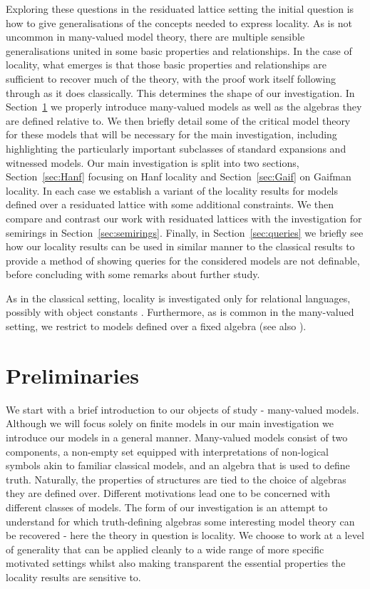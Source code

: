 \documentclass{lmcs} %
\newcommand{\?}{\ensuremath{\mkern0.4\thinmuskip}}
\begin{document}
Exploring these questions in the residuated lattice setting the initial question is how to give generalisations of the concepts needed to express locality. As is not uncommon in many-valued model theory, there are multiple sensible generalisations united in some basic properties and relationships. In the case of locality, what emerges is that those basic properties and relationships are sufficient to recover much of the theory, with the proof work itself following through as it does classically. This determines the shape of our investigation. In Section~\ref{sec:Prelim} we properly introduce many-valued models as well as the algebras they are defined relative to. We then briefly detail some of the critical model theory for these models that will be necessary for the main investigation, including highlighting the particularly important subclasses of standard expansions and witnessed models. Our main investigation is split into two sections, Section~\ref{sec:Hanf} focusing on Hanf locality and Section~\ref{sec:Gaif} on Gaifman locality. In each case we establish a variant of the locality results for models defined over a residuated lattice with some additional constraints. We then compare and contrast our work with residuated lattices with the investigation for semirings in Section~\ref{sec:semirings}. Finally, in Section~\ref{sec:queries} we briefly see how our locality results can be used in similar manner to the classical results to provide a method of showing queries for the considered models are not definable, before concluding with some remarks about further study. 

As in the classical setting, locality is investigated only for relational languages, possibly with object constants \cite{EbbinghausFlum95:Finmodeltheory,Libkin04:Elementsfinmod}. Furthermore, as is common in the many-valued setting, we restrict to models defined over a fixed algebra (see also \cite{BadiaCostaDellunde19:Synccharfuzzy,DellundeVidal19:ppform}).



\section{Preliminaries}\label{sec:Prelim}
We start with a brief introduction to our objects of study - many-valued models. Although we will focus solely on finite models in our main investigation we introduce our models in a general manner. Many-valued models consist of two components, a non-empty set equipped with interpretations of non-logical symbols akin to familiar classical models, and an algebra that is used to define truth. Naturally, the properties of structures are tied to the choice of algebras they are defined over. Different motivations lead one to be concerned with different classes of models. The form of our investigation is an attempt to understand for which truth-defining algebras some interesting model theory can be recovered - here the theory in question is locality. We choose to work at a level of generality that can be applied cleanly to a wide range of more specific motivated settings whilst also making transparent the essential properties the locality results are sensitive to. 
\end{document}
